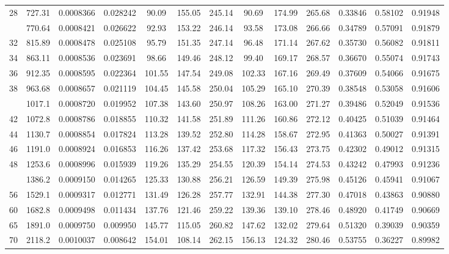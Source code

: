 \documentclass[12pt,a3paper]{article}
\begin{document}
\begin{enumerate}
\begin{center}
\begin{longtable}{c c c c c c c c c c c c c}
28 & 727.31 & 0.0008366 & 0.028242 & 90.09 & 155.05 & 245.14 & 90.69 & 174.99 & 265.68 & 0.33846 & 0.58102 & 0.91948 \\
\addlinespace
30 & 770.64 & 0.0008421 & 0.026622 & 92.93 & 153.22 & 246.14 & 93.58 & 173.08 & 266.66 & 0.34789 & 0.57091 & 0.91879 \\
32 & 815.89 & 0.0008478 & 0.025108 & 95.79 & 151.35 & 247.14 & 96.48 & 171.14 & 267.62 & 0.35730 & 0.56082 & 0.91811 \\
34 & 863.11 & 0.0008536 & 0.023691 & 98.66 & 149.46 & 248.12 & 99.40 & 169.17 & 268.57 & 0.36670 & 0.55074 & 0.91743 \\
36 & 912.35 & 0.0008595 & 0.022364 & 101.55 & 147.54 & 249.08 & 102.33 & 167.16 & 269.49 & 0.37609 & 0.54066 & 0.91675 \\
38 & 963.68 & 0.0008657 & 0.021119 & 104.45 & 145.58 & 250.04 & 105.29 & 165.10 & 270.39 & 0.38548 & 0.53058 & 0.91606 \\
\addlinespace
40 & 1017.1 & 0.0008720 & 0.019952 & 107.38 & 143.60 & 250.97 & 108.26 & 163.00 & 271.27 & 0.39486 & 0.52049 & 0.91536 \\
42 & 1072.8 & 0.0008786 & 0.018855 & 110.32 & 141.58 & 251.89 & 111.26 & 160.86 & 272.12 & 0.40425 & 0.51039 & 0.91464 \\
44 & 1130.7 & 0.0008854 & 0.017824 & 113.28 & 139.52 & 252.80 & 114.28 & 158.67 & 272.95 & 0.41363 & 0.50027 & 0.91391 \\
46 & 1191.0 & 0.0008924 & 0.016853 & 116.26 & 137.42 & 253.68 & 117.32 & 156.43 & 273.75 & 0.42302 & 0.49012 & 0.91315 \\
48 & 1253.6 & 0.0008996 & 0.015939 & 119.26 & 135.29 & 254.55 & 120.39 & 154.14 & 274.53 & 0.43242 & 0.47993 & 0.91236 \\
\addlinespace
52 & 1386.2 & 0.0009150 & 0.014265 & 125.33 & 130.88 & 256.21 & 126.59 & 149.39 & 275.98 & 0.45126 & 0.45941 & 0.91067 \\
56 & 1529.1 & 0.0009317 & 0.012771 & 131.49 & 126.28 & 257.77 & 132.91 & 144.38 & 277.30 & 0.47018 & 0.43863 & 0.90880 \\
60 & 1682.8 & 0.0009498 & 0.011434 & 137.76 & 121.46 & 259.22 & 139.36 & 139.10 & 278.46 & 0.48920 & 0.41749 & 0.90669 \\
65 & 1891.0 & 0.0009750 & 0.009950 & 145.77 & 115.05 & 260.82 & 147.62 & 132.02 & 279.64 & 0.51320 & 0.39039 & 0.90359 \\
70 & 2118.2 & 0.0010037 & 0.008642 & 154.01 & 108.14 & 262.15 & 156.13 & 124.32 & 280.46 & 0.53755 & 0.36227 & 0.89982 \\

\end{longtable}
\end{center}
\end{enumerate}
\end{document}
